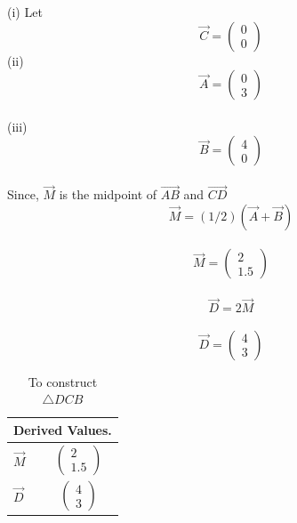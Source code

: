 \newline
(i) Let$$ \vec{C}= \begin{pmatrix}0\\0\end{pmatrix}$$
\newline
(ii)$$\vec{A}=\begin{pmatrix}0\\3\end{pmatrix}$$
\\
(iii)$$\vec{B}=\begin{pmatrix}4\\0\end{pmatrix}$$
\\
Since, $\vec{M}$ is the midpoint of $\vec{AB}$ and $\vec{CD}$
\\
$$\vec{M}=(1/2)(\vec{A}+\vec{B})$$
\\
$$\vec{M}=\begin{pmatrix}2\\1.5\end{pmatrix}$$
\\
$$\vec{D}=2\vec{M}$$
\\
$$\vec{D}=\begin{pmatrix}4\\3\end{pmatrix}$$
\begin{table}[H]
\centering
\begin{tabular}{ |p{3cm}|p{3cm}|  }
\hline
 \multicolumn{2}{|c|}{Derived Values.} \\
\hline
$\vec{M}$ & $$\begin{pmatrix}2\\1.5\end{pmatrix}$$\\
							
\hline
$\vec{D}$ & $$\begin{pmatrix}4\\3\end{pmatrix} $$\\
\hline
\end{tabular}
\caption{To construct $\triangle DCB$}
\end{table}
